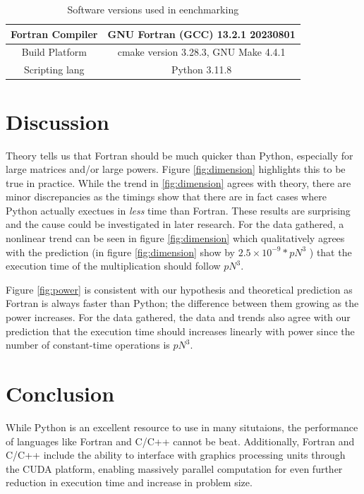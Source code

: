 \documentclass{article}
\begin{document}
    \begin{table}[h]
        \centering
        \begin{tabular}[pos]{|c|c|}
            \hline
            Fortran Compiler & GNU Fortran (GCC) 13.2.1 20230801 \\
            \hline
            Build Platform  & cmake version 3.28.3, GNU Make 4.4.1 \\
            \hline
            Scripting lang  & Python 3.11.8 \\
            \hline
        \end{tabular}
        \caption{Software versions used in eenchmarking}
        \label{tbl:versions}
    \end{table}
\pagebreak
\section{Discussion}

    Theory tells us that Fortran should be much quicker than Python, especially for large matrices and/or large powers.  Figure \ref{fig:dimension} highlights this to be true in practice.  While the trend in \ref{fig:dimension} agrees with theory, there are minor discrepancies as the timings show that there are in fact cases where Python actually exectues in \emph{less} time than Fortran.  These results are surprising and the cause could be investigated in later research.  For the data gathered, a nonlinear trend can be seen in figure \ref{fig:dimension} which qualitatively agrees with the prediction (in figure \ref{fig:dimension} show by $2.5 \times 10^{-9} * p N^3$ ) that the execution time of the multiplication should follow $p N^3$.

    Figure \ref{fig:power} is consistent with our hypothesis and theoretical prediction as Fortran is always faster than Python; the difference between them growing as the power increases.  For the data gathered, the data and trends also agree with our prediction that the execution time should increases linearly with power since the number of constant-time operations is $p N^3$.
\pagebreak
\section{Conclusion}

    While Python is an excellent resource to use in many situtaions, the performance of languages like Fortran and C/C++ cannot be beat.  Additionally, Fortran and C/C++ include the ability to interface with graphics processing units through the CUDA platform, enabling massively parallel computation for even further reduction in execution time and increase in problem size.
\end{document}
